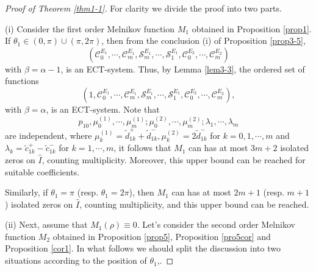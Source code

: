 \documentclass[11pt]{amsart}
\theoremstyle{remark}
\theoremstyle{definition}
\begin{document}
\begin{proof}[Proof of Theorem \ref{thm1-1}]


For   clarity we divide the proof into two parts.

(i) Consider the first order Melnikov function $M_1$ obtained in Proposition \ref{prop1}.
If $\theta_1\in (0,\pi)\cup (\pi, 2\pi)$,  then from  the conclusion (i) of Proposition \ref{prop3-5},
$$\left(\mathcal{C}_{0}^{E_1}, \cdots, \mathcal{C}_{m}^{E_1}, \mathcal{S}_{m}^{E_1}, \cdots, \mathcal{S}_{1}^{E_1},\mathcal{C}_{0}^{E_2}, \cdots, \mathcal{C}_{m}^{E_2}\right)$$
with $\beta=\alpha-1$, is an ECT-system. Thus, by Lemma \ref{lem3-3},   the ordered set of functions
$$\left(1, \mathcal{C}_{0}^{E_1}, \cdots, \mathcal{C}_{m}^{E_1}, \mathcal{S}_{m}^{E_1}, \cdots, \mathcal{S}_{1}^{E_1},\mathcal{C}_{0}^{E_2}, \cdots, \mathcal{C}_{m}^{E_2}\right),$$
with $\beta=\alpha$, is an ECT-system. Note that
$$p_{10},  \mu_0^{(1)}, \cdots,  \mu_{m}^{(1)}; \mu_0^{(2)}, \cdots,\mu_{m}^{(2)}; \lambda_1, \cdots,\lambda_{m}$$
are independent, where
$  \mu_k^{(1)}=\tilde{d}_{1k}^++\tilde{d}_{1k}^-,  \mu_k^{(2)}=2\tilde{d}_{1k}^-$ for $k=0,1,\cdots, m$ and $\lambda_{k}=\tilde{c}_{1k}^+-\tilde{c}_{1k}^-$ for $k=1,\cdots, m$,
it follows  that  $M_1$ can has at most  $3m+2$ isolated zeros  on $\hat{I}$,  counting multiplicity. Moreover, this upper bound can be reached
for suitable coefficients.





Similarly, if $\theta_1=\pi$ (resp. $\theta_1=2\pi$), then  $M_1$ can has at most $2m+1$ (resp. $m+1$)  isolated zeros  on $\hat{I}$,  counting multiplicity, and this upper bound can be reached.

(ii) Next,
  assume  that  $M_1(\rho)\equiv 0$.  Let's  consider the second order   Melnikov function $M_2$ obtained in Proposition \ref{prop5},  Proposition \ref{pro5cor} and Proposition \ref{cor1}.
 In what follows we should split the discussion into two situations according to the position of $\theta_1$,.



\end{proof}
\end{document}
